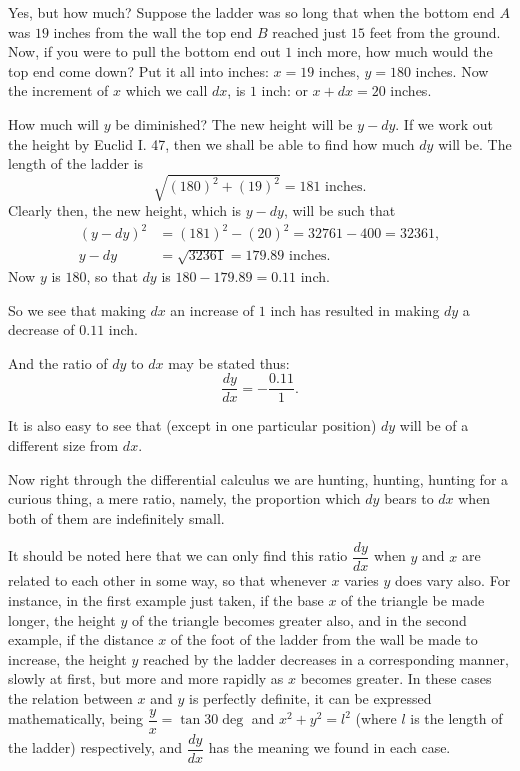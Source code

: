 \documentclass{ximera}
\begin{document}
Yes, but how much? Suppose the ladder was so
long that when the bottom end $A$ was $19$ inches from
the wall the top end $B$ reached just $15$ feet from the
ground. Now, if you were to pull the bottom end
out $1$ inch more, how much would the top end come
down? Put it all into inches: $x = 19$ inches, $y = 180$
inches. Now the increment of $x$ which we call $dx$,
is $1$ inch: or $x + dx = 20$ inches.

How much will $y$ be diminished? The new height
will be $y - dy$. If we work out the height by Euclid
I. 47, then we shall be able to find how much $dy$ will
be. The length of the ladder is
\[
\sqrt{ (180)^2 + (19)^2 } = 181 \text{ inches}.
\]
Clearly then, the new height, which is $y - dy$, will be
such that
\begin{align*}
(y - dy)^2 &= (181)^2 - (20)^2 = 32761 - 400 = 32361,   \\
y - dy     &= \sqrt{32361} = 179.89 \text{ inches}.
\end{align*}
Now $y$ is $180$, so that $dy$ is $180 - 179.89 = 0.11$ inch.

So we see that making $dx$ an increase of $1$ inch
has resulted in making $dy$ a decrease of $0.11$ inch.

And the ratio of $dy$ to $dx$ may be stated thus:
\[
\frac{dy}{dx} = - \frac{0.11}{1}.
\]

It is also easy to see that (except in one particular
position) $dy$ will be of a different size from $dx$.

Now right through the differential calculus we
are hunting, hunting, hunting for a curious thing, a mere ratio, namely, the proportion which $dy$ bears
to $dx$ when both of them are indefinitely
small.

It should be noted here that we can only find
this ratio $\dfrac{dy}{dx}$ when $y$ and $x$ are related to each
other in some way, so that whenever $x$ varies $y$ does
vary also. For instance, in the first example just
taken, if the base $x$ of the triangle be made longer,
the height $y$ of the triangle becomes greater also,
and in the second example, if the distance $x$ of the
foot of the ladder from the wall be made to increase,
the height $y$ reached by the ladder decreases in a
corresponding manner, slowly at first, but more and
more rapidly as $x$ becomes greater. In these cases
the relation between $x$ and $y$ is perfectly definite,
it can be expressed mathematically, being $\dfrac{y}{x} = \tan 30\deg$
and $x^2 + y^2 = l^2$ (where $l$ is the length of the ladder)
respectively, and $\dfrac{dy}{dx}$ has the meaning we found in
each case.
\end{document}
